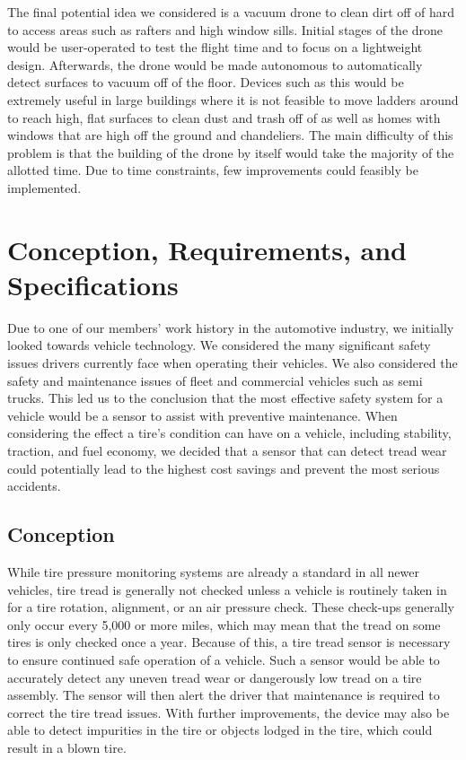 \documentclass[11pt]{IEEEtran}
\begin{document}
		The final potential idea we considered is a vacuum drone to clean dirt off of hard to access areas such as rafters and high window sills. Initial stages of the drone would be user-operated to test the flight time and to focus on a lightweight design. Afterwards, the drone would be made autonomous to automatically detect surfaces to vacuum off of the floor. Devices such as this would be extremely useful in large buildings where it is not feasible to move ladders around to reach high, flat surfaces to clean dust and trash off of as well as homes with windows that are high off the ground and chandeliers. The main difficulty of this problem is that the building of the drone by itself would take the majority of the allotted time. Due to time constraints, few improvements could feasibly be implemented. 

	\section{Conception, Requirements, and Specifications}
		Due to one of our members’ work history in the automotive industry, we initially looked towards vehicle technology. We considered the many significant safety issues drivers currently face when operating their vehicles. We also considered the safety and maintenance issues of fleet and commercial vehicles such as semi trucks. This led us to the conclusion that the most effective safety system for a vehicle would be a sensor to assist with preventive maintenance. When considering the effect a tire’s condition can have on a vehicle, including stability, traction, and fuel economy, we decided that a sensor that can detect tread wear could potentially lead to the highest cost savings and prevent the most serious accidents.

		\subsection{Conception}
			While tire pressure monitoring systems are already a standard in all newer vehicles, tire tread is generally not checked unless a vehicle is routinely taken in for a tire rotation, alignment, or an air pressure check. These check-ups generally only occur every 5,000 or more miles, which may mean that the tread on some tires is only checked once a year. Because of this, a tire tread sensor is necessary to ensure continued safe operation of a vehicle. Such a sensor would be able to accurately detect any uneven tread wear or dangerously low tread on a tire assembly. The sensor will then alert the driver that maintenance is required to correct the tire tread issues. With further improvements, the device may also be able to detect impurities in the tire or objects lodged in the tire, which could result in a blown tire.
\end{document}
